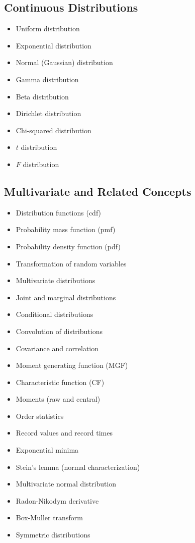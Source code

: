 \documentclass{amsart}
\begin{document}
\subsection{Continuous Distributions}
\begin{itemize}
  \item Uniform distribution
  \item Exponential distribution
  \item Normal (Gaussian) distribution
  \item Gamma distribution
  \item Beta distribution
  \item Dirichlet distribution
  \item Chi-squared distribution
  \item $t$ distribution
  \item $F$ distribution
\end{itemize}

\subsection{Multivariate and Related Concepts}
\begin{itemize}
  \item Distribution functions (cdf)
  \item Probability mass function (pmf)
  \item Probability density function (pdf)
  \item Transformation of random variables
  \item Multivariate distributions
  \item Joint and marginal distributions
  \item Conditional distributions
  \item Convolution of distributions
  \item Covariance and correlation
  \item Moment generating function (MGF)
  \item Characteristic function (CF)
  \item Moments (raw and central)
  \item Order statistics
  \item Record values and record times
  \item Exponential minima
  \item Stein's lemma (normal characterization)
  \item Multivariate normal distribution
  \item Radon-Nikodym derivative
  \item Box-Muller transform
  \item Symmetric distributions
\end{itemize}
\end{document}
